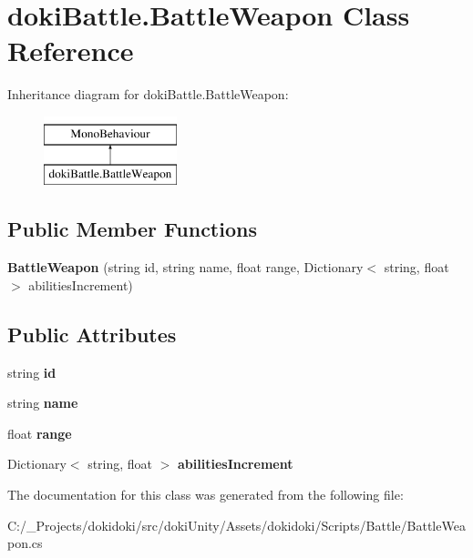 \hypertarget{classdoki_battle_1_1_battle_weapon}{}\section{doki\+Battle.\+Battle\+Weapon Class Reference}
\label{classdoki_battle_1_1_battle_weapon}
Inheritance diagram for doki\+Battle.\+Battle\+Weapon\+:\begin{figure}[H]
\begin{center}
\leavevmode
\includegraphics[height=2.000000cm]{classdoki_battle_1_1_battle_weapon}
\end{center}
\end{figure}
\subsection*{Public Member Functions}
\begin{DoxyCompactItemize}
\item 
{\bfseries Battle\+Weapon} (string id, string name, float range, Dictionary$<$ string, float $>$ abilities\+Increment)\hypertarget{classdoki_battle_1_1_battle_weapon_acfb91bff0d8def96fe54109f0037bf98}{}\label{classdoki_battle_1_1_battle_weapon_acfb91bff0d8def96fe54109f0037bf98}

\end{DoxyCompactItemize}
\subsection*{Public Attributes}
\begin{DoxyCompactItemize}
\item 
string {\bfseries id}\hypertarget{classdoki_battle_1_1_battle_weapon_aefadd59ab0e1ad827923e979a293e324}{}\label{classdoki_battle_1_1_battle_weapon_aefadd59ab0e1ad827923e979a293e324}

\item 
string {\bfseries name}\hypertarget{classdoki_battle_1_1_battle_weapon_a7dbe896147d82072913d3a7f11256a1c}{}\label{classdoki_battle_1_1_battle_weapon_a7dbe896147d82072913d3a7f11256a1c}

\item 
float {\bfseries range}\hypertarget{classdoki_battle_1_1_battle_weapon_ad0cfeccb637f568c9706a24a1abda699}{}\label{classdoki_battle_1_1_battle_weapon_ad0cfeccb637f568c9706a24a1abda699}

\item 
Dictionary$<$ string, float $>$ {\bfseries abilities\+Increment}\hypertarget{classdoki_battle_1_1_battle_weapon_a3cb0986caa5bc161d85c64f975c8a28e}{}\label{classdoki_battle_1_1_battle_weapon_a3cb0986caa5bc161d85c64f975c8a28e}

\end{DoxyCompactItemize}


The documentation for this class was generated from the following file\+:\begin{DoxyCompactItemize}
\item 
C\+:/\+\_\+\+Projects/dokidoki/src/doki\+Unity/\+Assets/dokidoki/\+Scripts/\+Battle/Battle\+Weapon.\+cs\end{DoxyCompactItemize}
